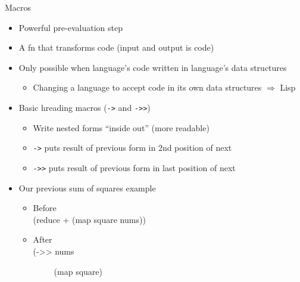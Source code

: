 \documentclass{beamer}
\begin{document}
\begin{frame}[allowframebreaks]{Macros}
  \begin{itemize}
  \item Powerful pre-evaluation step
  \item A fn that transforms code (input and output is code)
  \item Only possible when language's code written in language's data
    structures
    \begin{itemize}
    \item Changing a language to accept code in its own data structures
      $\Rightarrow$ Lisp
    \end{itemize}

    \framebreak
  \item Basic hreading macros (\texttt{->} and \texttt{->>})
    \begin{itemize}
    \item Write nested forms ``inside out'' (more readable)
    \item \texttt{->} puts result of previous form in 2nd position
      of next
    \item \texttt{->>} puts result of previous form in last position
      of next    
    \end{itemize}
  \item Our previous sum of squares example
    \begin{itemize}
    \item Before\\
{\ttfamily\color{black}
%
\textcolor[rgb]{0.54901963,0.54901963,0.54901963}{(}\textcolor[rgb]{0.28235295,0.23921569,0.54509807}{reduce}
+
\textcolor[rgb]{0.54901963,0.54901963,0.54901963}{(}\textcolor[rgb]{0.28235295,0.23921569,0.54509807}{map}
square nums\textcolor[rgb]{0.54901963,0.54901963,0.54901963}{))}}
    \item After\\
{\ttfamily\color{black}
\textcolor[rgb]{0.54901963,0.54901963,0.54901963}{(}\textcolor[rgb]{0.49803922,0.0,0.49803922}{{}-{\textgreater}{\textgreater}}
nums}

{\ttfamily\color{black}
\ \ \ \ \ \textcolor[rgb]{0.54901963,0.54901963,0.54901963}{(}\textcolor[rgb]{0.28235295,0.23921569,0.54509807}{map}
square\textcolor[rgb]{0.54901963,0.54901963,0.54901963}{)}}


\end{itemize}
\end{itemize}
\end{frame}
\end{document}
